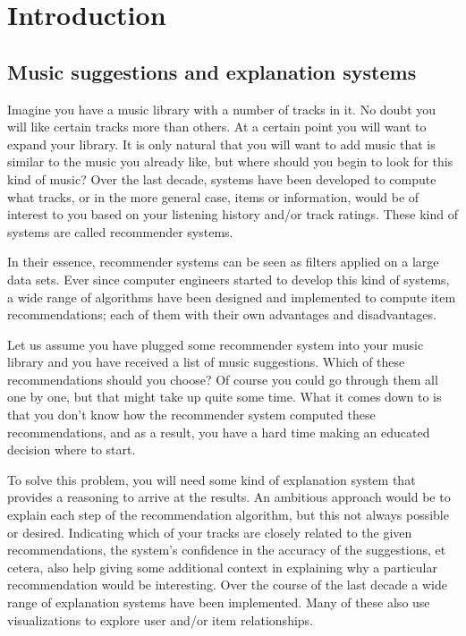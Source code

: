 \chapter{Introduction}\label{chapter:introduction}

\section{Music suggestions and explanation systems}\label{chapter:introduction:section:context}

Imagine you have a music library with a number of tracks in it. No doubt you will like certain tracks more than others. At a certain point you will want to expand your library. It is only natural that you will want to add music that is similar to the music you already like, but where should you begin to look for this kind of music? Over the last decade, systems have been developed to compute what tracks, or in the more general case, items or information, would be of interest to you based on your listening history and/or track ratings. These kind of systems are called recommender systems.

In their essence, recommender systems can be seen as filters applied on a large data sets. Ever since computer engineers started to develop this kind of systems, a wide range of algorithms have been designed and implemented to compute item recommendations\cite{burke:2002, melville:2002:CCF:777092.777124, pazzani:2007:CRS:1768197.1768209, rajaraman:2012}; each of them with their own advantages and disadvantages.

Let us assume you have plugged some recommender system into your music library and you have received a list of music suggestions. Which of these recommendations should you choose? Of course you could go through them all one by one, but that might take up quite some time. What it comes down to is that you don't know how the recommender system computed these recommendations, and as a result, you have a hard time making an educated decision where to start.

To solve this problem, you will need some kind of explanation system that provides a reasoning to arrive at the results. An ambitious approach would be to explain each step of the recommendation algorithm, but this not always possible or desired. Indicating which of your tracks are closely related to the given recommendations, the system's confidence in the accuracy of the suggestions, et cetera, also help giving some additional context in explaining why a particular recommendation would be interesting\cite{herlocker:2000}. Over the course of the last decade a wide range of explanation systems have been implemented. Many of these also use visualizations to explore user and/or item relationships\cite{bostandjiev:2012, crnovrsanin:2011:VRN:2421953.2422013, faridani:2010:opinionspace, gou:2011:SIF:2016656.2016671, gretarsson:2010, odonovan:2008}.

